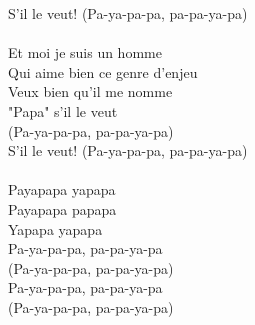 S'il le veut! (Pa-ya-pa-pa, pa-pa-ya-pa)\\\\
Et moi je suis un homme\\
Qui aime bien ce genre d'enjeu\\
Veux bien qu'il me nomme\\
"Papa" s'il le veut\\
(Pa-ya-pa-pa, pa-pa-ya-pa)\\
S'il le veut! (Pa-ya-pa-pa, pa-pa-ya-pa)\\\\
Payapapa yapapa\\
Payapapa papapa\\
Yapapa yapapa\\
Pa-ya-pa-pa, pa-pa-ya-pa\\
(Pa-ya-pa-pa, pa-pa-ya-pa)\\
Pa-ya-pa-pa, pa-pa-ya-pa\\
(Pa-ya-pa-pa, pa-pa-ya-pa)